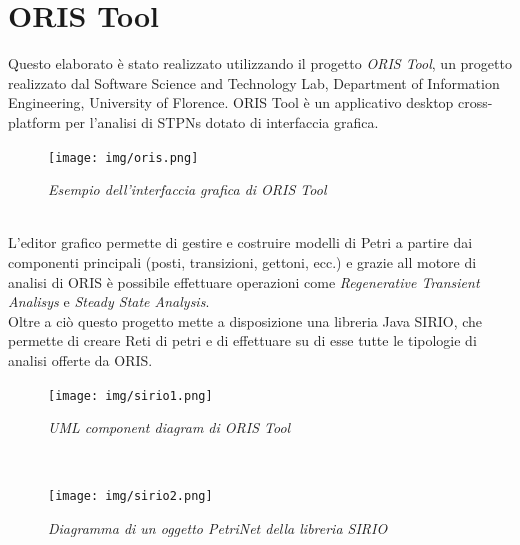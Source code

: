 \documentclass[12pt,a4paper,italian]{article}
\begin{document}
\section{ORIS Tool}
\thispagestyle{empty}
Questo elaborato è stato realizzato utilizzando il progetto \emph{ORIS Tool}, un progetto realizzato dal Software Science and Technology Lab, Department of Information Engineering, University of Florence. ORIS Tool è un applicativo desktop cross-platform per l'analisi di STPNs dotato di interfaccia grafica. \\
\begin{figure}[ht!]
	\centering
	\texttt{[image: img/oris.png]}
	\caption{\emph{Esempio dell'interfaccia grafica di ORIS Tool}}\label{oris}
\end{figure} \\
L'editor grafico permette di gestire e costruire modelli di Petri a partire dai componenti principali (posti, transizioni, gettoni, ecc.) e grazie all motore di analisi di ORIS è possibile effettuare operazioni come \emph{Regenerative Transient Analisys} e \emph{Steady State Analysis}.\\
Oltre a ciò questo progetto mette a disposizione una libreria Java SIRIO, che permette di creare Reti di petri e di effettuare su di esse tutte le tipologie di analisi offerte da ORIS\cite{oris}.
\begin{figure}
	\centering
	\texttt{[image: img/sirio1.png]}
	\caption{\emph{UML component diagram di ORIS Tool}}\label{sirio}
\end{figure}\\
\begin{figure}
	\centering
	\texttt{[image: img/sirio2.png]}
	\caption{\emph{Diagramma di un oggetto PetriNet della libreria SIRIO}}\label{sirio2}
\end{figure}\\
\newpage
\end{document}
